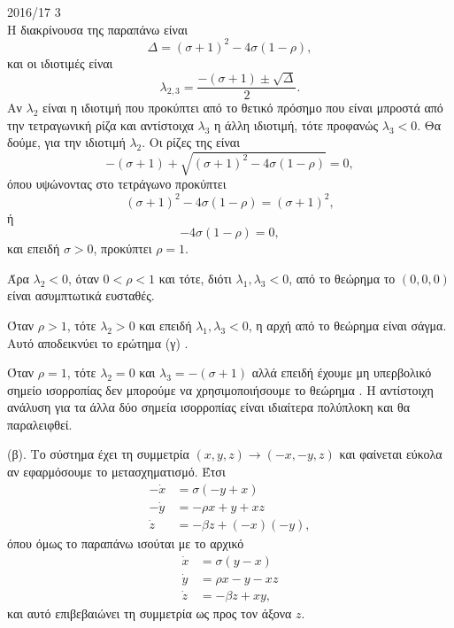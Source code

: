 \begin{solution}{2016/17 3}
\begin{equation*}
    \end{equation*}
    Η διακρίνουσα της παραπάνω είναι
    \begin{equation*}
        \Delta = {(\sigma + 1)}^2 - 4\sigma(1 - \rho),
    \end{equation*}
    και οι ιδιοτιμές είναι
    \begin{equation*}
        \lambda_{2,3} = \frac{-(\sigma + 1) \pm \sqrt{\Delta}}{2}.
    \end{equation*}
    Αν \( \lambda_2 \) είναι η ιδιοτιμή που προκύπτει από το θετικό
    πρόσημο που είναι μπροστά από την τετραγωνική ρίζα και αντίστοιχα
    \( \lambda_3 \) η άλλη ιδιοτιμή, τότε προφανώς  \( \lambda_3 < 0 \). Θα
    δούμε, για την ιδιοτιμή \( \lambda_2 \). Οι ρίζες της είναι
    \begin{equation*}
        -(\sigma + 1) + \sqrt{{(\sigma + 1)}^2 - 4\sigma(1 - \rho)} = 0,
    \end{equation*}
    όπου υψώνοντας στο τετράγωνο προκύπτει
    \begin{equation*}
        {(\sigma + 1)}^2 - 4\sigma(1 - \rho) = {(\sigma + 1)}^2,
    \end{equation*}
    ή
    \begin{equation*}
        - 4\sigma(1 - \rho) = 0,
    \end{equation*}
    και επειδή \( \sigma > 0 \), προκύπτει \( \rho = 1 \).

    Άρα \( \lambda_2 < 0 \), όταν \( 0 < \rho < 1 \) και τότε, διότι
    \( \lambda_1, \lambda_3 < 0 \), από το θεώρημα
     το \( (0, 0, 0) \) είναι ασυμπτωτικά ευσταθές.

    Όταν \( \rho > 1 \), τότε \( \lambda_2 > 0 \) και επειδή
    \( \lambda_1, \lambda_3 < 0 \), η αρχή από το θεώρημα
     είναι σάγμα. Αυτό αποδεικνύει το ερώτημα (γ)
    .

    Όταν \( \rho = 1 \), τότε \( \lambda_2 = 0 \) και \( \lambda_3 = -(\sigma +
    1) \) αλλά επειδή έχουμε μη υπερβολικό σημείο ισορροπίας δεν μπορούμε να
    χρησιμοποιήσουμε το θεώρημα . Η αντίστοιχη ανάλυση για
    τα άλλα δύο σημεία ισορροπίας είναι ιδιαίτερα πολύπλοκη και θα παραλειφθεί.

    (β). Το σύστημα έχει τη συμμετρία \( (x, y, z) \to (-x, -y, z) \) και
    φαίνεται εύκολα αν εφαρμόσουμε το μετασχηματισμό. Έτσι
    \begin{align*}
        -\dot{x} &= \sigma(-y + x) \\
        -\dot{y} &= -\rho x + y + xz \\
        \dot{z} &= -\beta z + (-x)(-y),
    \end{align*}
    όπου όμως το παραπάνω ισούται με το αρχικό
    \begin{align*}
        \dot{x} &= \sigma(y - x) \\
        \dot{y} &= \rho x - y - xz \\
        \dot{z} &= -\beta z + xy,
    \end{align*}
    και αυτό επιβεβαιώνει τη συμμετρία ως προς τον άξονα \( z \).


\end{solution}
